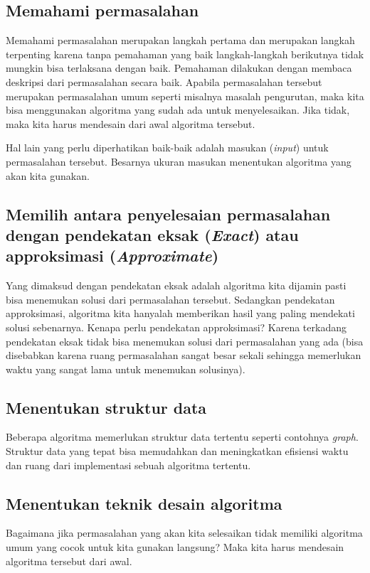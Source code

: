 \subsection{Memahami permasalahan}
Memahami permasalahan merupakan langkah pertama dan merupakan langkah terpenting karena tanpa pemahaman yang baik langkah-langkah berikutnya tidak mungkin bisa terlaksana dengan baik. Pemahaman dilakukan dengan membaca deskripsi dari permasalahan secara baik. Apabila permasalahan tersebut merupakan permasalahan umum seperti misalnya masalah pengurutan, maka kita bisa menggunakan algoritma yang sudah ada untuk menyelesaikan. Jika tidak, maka kita harus mendesain dari awal algoritma tersebut.

Hal lain yang perlu diperhatikan baik-baik adalah masukan (\textit{input}) untuk permasalahan tersebut. Besarnya ukuran masukan menentukan algoritma yang akan kita gunakan. 

\subsection{Memilih antara penyelesaian permasalahan dengan pendekatan eksak (\textit{Exact}) atau approksimasi (\textit{Approximate})}
Yang dimaksud dengan pendekatan eksak adalah algoritma kita dijamin pasti bisa menemukan solusi dari permasalahan tersebut. Sedangkan pendekatan approksimasi, algoritma kita hanyalah memberikan hasil yang paling mendekati solusi sebenarnya. Kenapa perlu pendekatan approksimasi? Karena terkadang pendekatan eksak tidak bisa menemukan solusi dari permasalahan yang ada (bisa disebabkan karena ruang permasalahan sangat besar sekali sehingga memerlukan waktu yang sangat lama untuk menemukan solusinya).
 

\subsection{Menentukan struktur data}
Beberapa algoritma memerlukan struktur data tertentu seperti contohnya \textit{graph}. Struktur data yang tepat bisa memudahkan dan meningkatkan efisiensi waktu dan ruang dari implementasi sebuah algoritma tertentu. 

\subsection{Menentukan teknik desain algoritma}
Bagaimana jika permasalahan yang akan kita selesaikan tidak memiliki algoritma umum yang cocok untuk kita gunakan langsung? Maka kita harus mendesain algoritma tersebut dari awal. 

